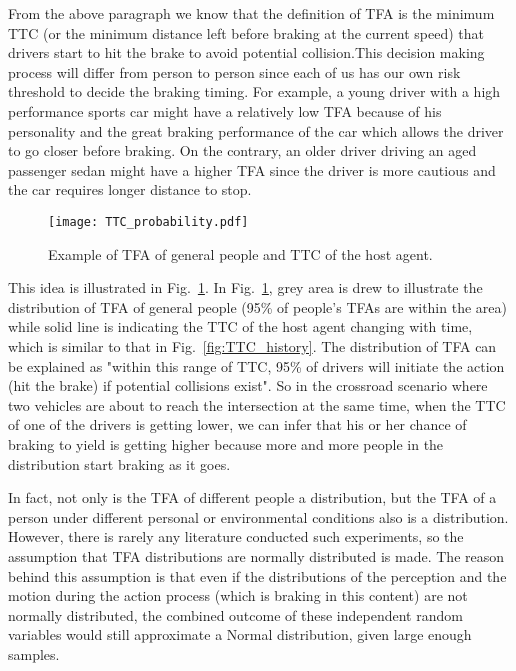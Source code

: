 From the above paragraph we know that the definition of TFA is the minimum TTC (or the minimum distance left before braking at the current speed) that drivers start to hit the brake to avoid potential collision.This decision making process will differ from person to person since each of us has our own risk threshold to decide the braking timing. For example, a young driver with a high performance sports car might have a relatively low TFA because of his personality and the great braking performance of the car which allows the driver to go closer before braking. On the contrary, an older driver driving an aged passenger sedan might have a higher TFA since the driver is more cautious and the car requires longer distance to stop.

\begin{figure}[htbp!]
\begin{center}
\texttt{[image: TTC\_probability.pdf]}
\end{center}
\caption{Example of TFA of general people and TTC of the host agent.}
\label{fig:TTC_TFA} 
\end{figure}

This idea is illustrated in Fig.~\ref{fig:TTC_TFA}. In Fig.~\ref{fig:TTC_TFA}, grey area is drew to illustrate the distribution of TFA of general people (95\% of people's TFAs are within the area) while solid line is indicating the TTC of the host agent changing with time, which is similar to that in Fig.~\ref{fig:TTC_history}. The distribution of TFA can be explained as "within this range of TTC, 95\% of drivers will initiate the action (hit the brake) if potential collisions exist". So in the crossroad scenario where two vehicles are about to reach the intersection at the same time, when the TTC of one of the drivers is getting lower, we can infer that his or her chance of braking to yield is getting higher because more and more people in the distribution start braking as it goes. 

In fact, not only is the TFA of different people a distribution, but the TFA of a person under different personal or environmental conditions also is a distribution. However, there is rarely any literature conducted such experiments, so the assumption that TFA distributions are normally distributed is made. The reason behind this assumption is that even if the distributions of the perception and the motion during the action process (which is braking in this content) are not normally distributed, the combined outcome of these independent random variables would still approximate a Normal distribution, given large enough samples. 

